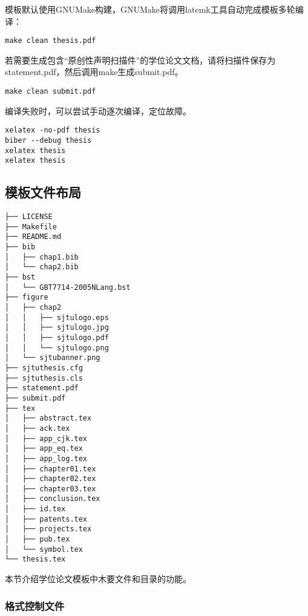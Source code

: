 模板默认使用GNUMake构建，GNUMake将调用latemk工具自动完成模板多轮编译：

\begin{lstlisting}[basicstyle=\small\ttfamily, caption={编译模板}, numbers=none]
make clean thesis.pdf
\end{lstlisting}

若需要生成包含“原创性声明扫描件”的学位论文文档，请将扫描件保存为statement.pdf，然后调用make生成submit.pdf。

\begin{lstlisting}[basicstyle=\small\ttfamily, caption={生成用于提交的学位论文}, numbers=none]
make clean submit.pdf
\end{lstlisting}

编译失败时，可以尝试手动逐次编译，定位故障。

\begin{lstlisting}[basicstyle=\small\ttfamily, caption={手动逐次编译}, numbers=none]
xelatex -no-pdf thesis
biber --debug thesis
xelatex thesis
xelatex thesis
\end{lstlisting}

\subsection{模板文件布局}
\label{sec:layout}

\begin{lstlisting}[basicstyle=\small\ttfamily,caption={模板文件布局},label=layout,float,numbers=none]
├── LICENSE
├── Makefile
├── README.md
├── bib
│   ├── chap1.bib
│   └── chap2.bib
├── bst
│   └── GBT7714-2005NLang.bst
├── figure
│   ├── chap2
│   │   ├── sjtulogo.eps
│   │   ├── sjtulogo.jpg
│   │   ├── sjtulogo.pdf
│   │   └── sjtulogo.png
│   └── sjtubanner.png
├── sjtuthesis.cfg
├── sjtuthesis.cls
├── statement.pdf
├── submit.pdf
├── tex
│   ├── abstract.tex
│   ├── ack.tex
│   ├── app_cjk.tex
│   ├── app_eq.tex
│   ├── app_log.tex
│   ├── chapter01.tex
│   ├── chapter02.tex
│   ├── chapter03.tex
│   ├── conclusion.tex
│   ├── id.tex
│   ├── patents.tex
│   ├── projects.tex
│   ├── pub.tex
│   └── symbol.tex
└── thesis.tex
\end{lstlisting}

本节介绍学位论文模板中木要文件和目录的功能。

\subsubsection{格式控制文件}
\label{sec:format}

